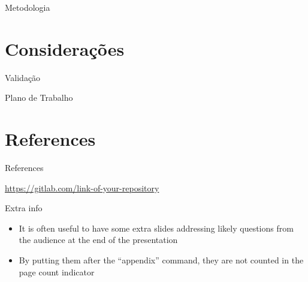 \begin{frame}{Metodologia}
\end{frame}

\section{Considerações}

\begin{frame}{Validação}
\end{frame}

\begin{frame}{Plano de Trabalho}
\end{frame}

\section{References}

\begin{frame}[allowframebreaks]{References}
  \nocite{bronevetsky02, schmidt03:MSc, FSF:GNU-GPL, CORBA:spec, MenaChalco08, natbib, biblatex, eco:09}
  \printbibliography
\end{frame}

\begin{frame}{\insertshorttitle}
  \overview

  {%
    \centering\noindent%
    \url{https://gitlab.com/link-of-your-repository}\par
  }

\end{frame}

\showqrcode

\appendix

\begin{frame}{Extra info}
  \begin{itemize}
    \item It is often useful to have some extra slides addressing likely questions from the audience at the end of the presentation
    \item By putting them after the ``appendix'' command, they are not counted in the page count indicator
  \end{itemize}
\end{frame}
